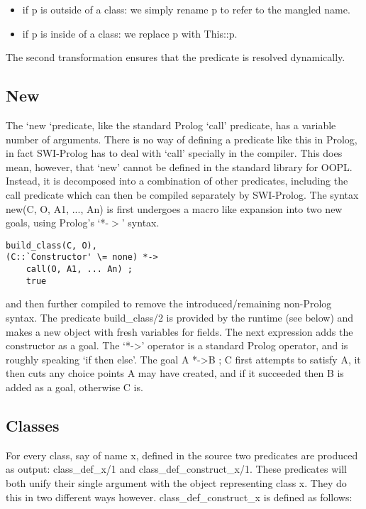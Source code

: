 \documentclass[12pt,a4paper,twoside,openright]{report}
\begin{document}
\begin{itemize}
	\item if p is outside of a class: we simply rename p to refer to the mangled name.
	\item if p is inside of a class: we replace p with This::p.
\end{itemize}

The second transformation ensures that the predicate is resolved dynamically.

\subsection{New}

The `new `predicate, like the standard Prolog `call' predicate, has a variable number of arguments. There is no way of defining a predicate like this in Prolog, in fact SWI-Prolog has to deal with `call' specially in the compiler. This does mean, however, that `new' cannot be defined in the standard library for OOPL. Instead, it is decomposed into a combination of other predicates, including the call predicate which can then be compiled separately by SWI-Prolog. The syntax new(C, O, A1, ..., An) is first undergoes a macro like expansion into two new goals, using Prolog's `*-$>$' syntax.

\begin{lstlisting}
build_class(C, O),
(C::`Constructor' \= none) *-> 
	call(O, A1, ... An) ; 
	true
\end{lstlisting}

\noindent and then further compiled to remove the introduced/remaining non-Prolog syntax. The predicate build_class/2 is provided by the runtime (see below) and makes a new object with fresh variables for fields. The next expression adds the constructor as a goal. The `*-\textgreater' operator is a standard Prolog operator, and is roughly speaking `if then else'. The goal A *-\textgreater B ; C first attempts to satisfy A, it then cuts any choice points A may have created, and if it succeeded then B is added as a goal, otherwise C is.

\subsection{Classes}

For every class, say of name x, defined in the source two predicates are produced as output: class_def_x/1 and class_def_construct_x/1. These predicates will both unify their single argument with the object representing class x. They do this in two different ways however. class_def_construct_x is defined as follows:
\end{document}
